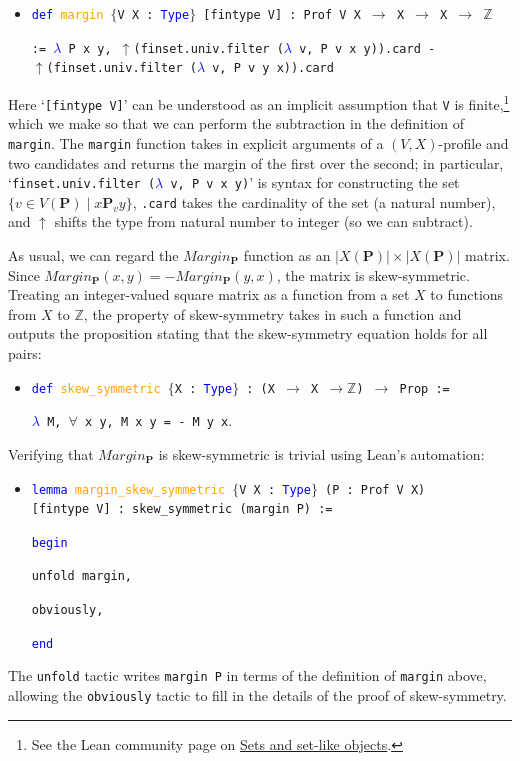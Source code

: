\documentclass[runningheads]{llncs}
\begin{document}
\begin{itemize}
\item[] \texttt{\textcolor{blue}{def} \textcolor{orange}{margin} $\{$V X : \textcolor{blue}{Type}$\}$  [fintype V] : Prof V X $\to$ X $\to$ X $\to$ $\mathbb{Z}$} 

\texttt{:=
    \textcolor{blue}{$\lambda$} P x y, $\uparrow$(finset.univ.filter (\textcolor{blue}{$\lambda$} v, P v x y)).card
        -} \\ \texttt{$\uparrow$(finset.univ.filter (\textcolor{blue}{$\lambda$} v, P v y x)).card}
\end{itemize}
Here `\texttt{[fintype V]}' can be understood as an implicit assumption that \texttt{V} is finite,\footnote{See the Lean community page on \href{https://leanprover-community.github.io/theories/sets.html\#finite-types}{Sets and set-like objects}.} which we make so that we can perform the subtraction in the definition of \texttt{margin}. The \texttt{margin} function takes in explicit arguments of a $(V,X)$-profile and two candidates  and returns the margin of the first over the second; in particular, `\texttt{finset.univ.filter (\textcolor{blue}{$\lambda$} v, P v x y)}' is syntax for constructing  the set \\ $\{v\in V(\mathbf{P})\mid x\mathbf{P}_v y\}$, \texttt{.card} takes the cardinality of the set (a natural number), and $\uparrow$ shifts the type from natural number to integer (so we can subtract).

As usual, we can regard the $Margin_\mathbf{P}$ function as an $|X(\mathbf{P})|\times |X(\mathbf{P})|$ matrix. Since $Margin_\mathbf{P}(x,y)=-Margin_\mathbf{P}(y,x)$, the matrix is skew-symmetric. Treating an integer-valued square matrix as a function from a set $X$ to functions from $X$ to $\mathbb{Z}$, the property of skew-symmetry takes in such a function and outputs the proposition stating that the skew-symmetry equation holds for all pairs:
\begin{itemize}
\item[] \texttt{\textcolor{blue}{def} \textcolor{orange}{skew\_symmetric} $\{$X : \textcolor{blue}{Type}$\}$ : (X $\to$ X $\to \mathbb{Z}$) $\to$ Prop :=} 

\texttt{\textcolor{blue}{$\lambda$} M, $\forall$ x y, M x y = - M y x}.
\end{itemize}
Verifying that $Margin_\mathbf{P}$ is skew-symmetric is trivial using Lean's automation:
\begin{itemize}
\item[] \texttt{\textcolor{blue}{lemma} \textcolor{orange}{margin\_skew\_symmetric} $\{$V X : \textcolor{blue}{Type}$\}$ (P : Prof V X)}\\ \texttt{[fintype V] : skew\_symmetric (margin P) :=} 
 
\texttt{\textcolor{blue}{begin}}

\quad \texttt{unfold margin,}

\quad \texttt{obviously,}

\texttt{\textcolor{blue}{end}}
\end{itemize}
The \texttt{unfold} tactic writes \texttt{margin P} in terms of the definition of \texttt{margin} above, allowing the \texttt{obviously} tactic to fill in the details of the proof of skew-symmetry.
\end{document}
